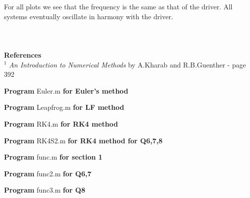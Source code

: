 \documentclass[14pt]{extarticle}
\begin{document}
\noindent For all plots we see that the frequency is the same as that of the driver. All systems eventually oscillate in harmony with the driver.\\
\\
\\
\\
\noindent \textbf{References}\\
$^1$ \textit{An Introduction
to Numerical Methods} by A.Kharab and R.B.Guenther - page 392


\pagebreak

\begin{center}
\textbf{Program} Euler.m \textbf{for Euler's method}
\end{center}


\begin{center}
\textbf{Program} Leapfrog.m \textbf{for LF method}
\end{center}


\begin{center}
\textbf{Program} RK4.m \textbf{for RK4 method}
\end{center}


\begin{center}
\textbf{Program} RK4S2.m \textbf{for RK4 method for Q6,7,8}
\end{center}


\begin{center}
\textbf{Program} func.m \textbf{for section 1}
\end{center}


\begin{center}
\textbf{Program} func2.m \textbf{for Q6,7}
\end{center}


\begin{center}
\textbf{Program} func3.m \textbf{for Q8}
\end{center}

\end{document}
